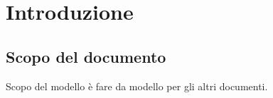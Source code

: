 \thispagestyle{fancy} %

\chapter{Introduzione}
\thispagestyle{fancy} %

\section{Scopo del documento}
Scopo del modello \`e fare da modello per gli altri documenti.





